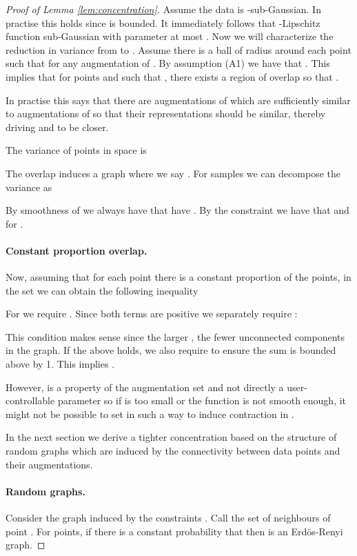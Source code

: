 \documentclass{article}
\begin{document}
\begin{proof}[Proof of Lemma \ref{lem:concentration}]
Assume the data  is -sub-Gaussian. In practise this holds since  is bounded. It immediately follows that -Lipschitz function  sub-Gaussian with parameter at most . Now we will characterize the reduction in variance from  to . Assume there is a ball of radius  around each point such that for any augmentation  of  . By assumption (A1) we have that . This implies that for points  and  such that , there exists a region of overlap so that . 

In practise this says that there are augmentations of  which are sufficiently similar to augmentations of  so that their representations should be similar, thereby driving  and  to be closer.

The variance of points in  space is

The overlap  induces a graph where we say .
For  samples we can decompose the variance as

 By smoothness of  we always have that have . By the constraint we have that  and for .

\paragraph{Constant proportion overlap.}
Now, assuming that for each point  there is a constant proportion of the points,  in the set   we can obtain the following inequality


For  we require . Since both terms are positive we separately require :

This condition makes sense since the larger , the fewer unconnected components in the graph.
If the above holds, we also require  to ensure the sum is bounded above by 1. This implies .

However,  is a property of the augmentation set and not directly a user-controllable parameter so if  is too small or the function is not smooth enough, it might not be possible to set  in such a way to induce contraction in . 

In the next section we derive a tighter concentration based on the structure of random graphs which are induced by the connectivity between data points and their augmentations.

\paragraph{Random graphs.}
 Consider the graph  induced by the constraints . Call  the set of neighbours of point . For  points, if there is a constant probability  that  then  is an Erd\"{o}s-Renyi graph. 
 

\end{proof}
\end{document}
